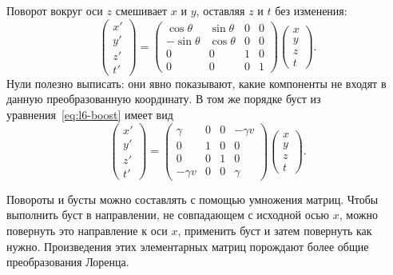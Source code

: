 Поворот вокруг оси \(z\) смешивает \(x\) и \(y\), оставляя \(z\) и \(t\) без изменения:
\begin{equation}
\begin{pmatrix}
  x'\\ y'\\ z'\\ t'
\end{pmatrix}
=
\begin{pmatrix}
  \cos\theta & \sin\theta & 0 & 0\\
  -\sin\theta & \cos\theta & 0 & 0\\
  0 & 0 & 1 & 0\\
  0 & 0 & 0 & 1
\end{pmatrix}
\begin{pmatrix}
  x\\ y\\ z\\ t
\end{pmatrix}.
\end{equation}
Нули полезно выписать: они явно показывают, какие компоненты не входят в данную преобразованную координату. В том же порядке буст из уравнения~\eqref{eq:l6-boost} имеет вид
\begin{equation}
\begin{pmatrix}
  x'\\ y'\\ z'\\ t'
\end{pmatrix}
=
\begin{pmatrix}
  \gamma & 0 & 0 & -\gamma v\\
  0 & 1 & 0 & 0\\
  0 & 0 & 1 & 0\\
  -\gamma v & 0 & 0 & \gamma
\end{pmatrix}
\begin{pmatrix}
  x\\ y\\ z\\ t
\end{pmatrix}.
\end{equation}

Повороты и бусты можно составлять с помощью умножения матриц. Чтобы выполнить буст в направлении, не совпадающем с исходной осью \(x\), можно повернуть это направление к оси \(x\), применить буст и затем повернуть как нужно. Произведения этих элементарных матриц порождают более общие преобразования Лоренца.

\begin{classroomqa}
\end{classroomqa}

